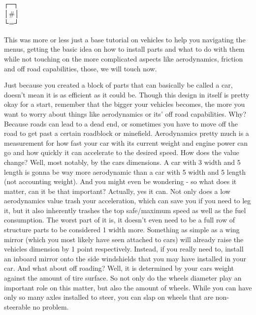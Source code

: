 \vspace{0.5\baselineskip}
\begin{spacing}{0.75}
┌─┐\\
│\#│\\
└=┘
\end{spacing}
\vspace{0.5\baselineskip}


This was more or less just a base tutorial on vehicles to help you navigating the menus, getting the basic idea on how to install parts and what to do with them while not touching on the more complicated aspects like aerodynamics, friction and off road capabilities, those, we will touch now.

Just because you created a block of parts that can basically be called a car, doesn't mean it is as efficient as it could be. Though this design in itself is pretty okay for a start, remember that the bigger your vehicles becomes, the more you want to worry about things like aerodynamics or its' off road capabilities. Why? Because roads can lead to a dead end, or sometimes you have to move off the road to get past a certain roadblock or minefield. Aerodynamics pretty much is a measurement for how fast your car with its current weight and engine power can go and how quickly it can accelerate to the desired speed. How does the value change? Well, most notably, by the cars dimensions. A car with 3 width and 5 length is gonna be way more aerodynamic than a car with 5 width and 5 length (not accounting weight). And you might even be wondering - so what does it matter, can it be that important? Actually, yes it can. Not only does a low aerodynamics value trash your acceleration, which can save you if you need to leg it, but it also inherently trashes the top safe/maximum speed as well as the fuel consumption. The worst part of it is, it doesn't even need to be a full row of structure parts to be considered 1 width more. Something as simple as a wing mirror (which you most likely have seen attached to cars) will already raise the vehicles dimension by 1 point respectively. Instead, if you really need to, install an inboard mirror onto the side windshields that you may have installed in your car. And what about off roading? Well, it is determined by your cars weight against the amount of tire surface. So not only do the wheels diameter play an important role on this matter, but also the amount of wheels. While you can have only so many axles installed to steer, you can slap on wheels that are non-steerable no problem.

